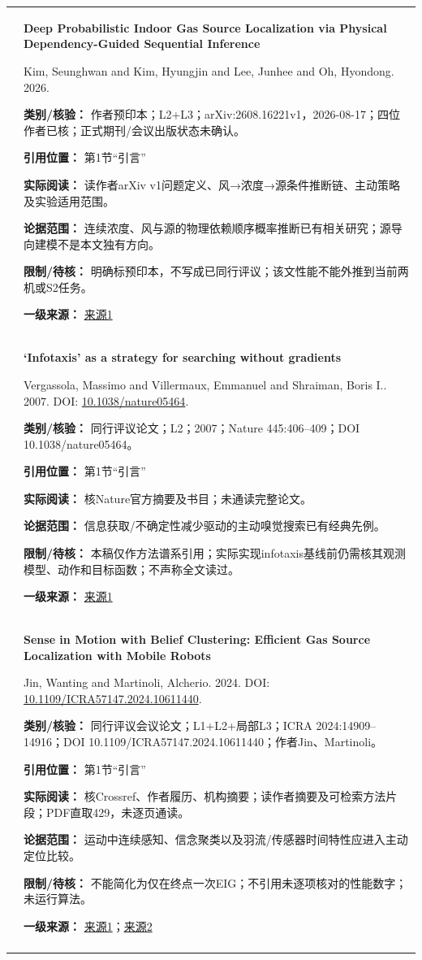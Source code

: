 \begin{longtable}{@{}>{\raggedright\arraybackslash}p{0.7cm}>{\raggedright\arraybackslash}p{14.8cm}@{}}
11 & \textbf{Deep Probabilistic Indoor Gas Source Localization via Physical Dependency-Guided Sequential Inference}\par Kim, Seunghwan and Kim, Hyungjin and Lee, Junhee and Oh, Hyondong. 2026. \par\textbf{类别/核验：} 作者预印本；L2+L3；arXiv:2608.16221v1，2026-08-17；四位作者已核；正式期刊/会议出版状态未确认。\par\textbf{引用位置：} 第1节“引言”\par\textbf{实际阅读：} 读作者arXiv v1问题定义、风→浓度→源条件推断链、主动策略及实验适用范围。\par\textbf{论据范围：} 连续浓度、风与源的物理依赖顺序概率推断已有相关研究；源导向建模不是本文独有方向。\par\textbf{限制/待核：} 明确标预印本，不写成已同行评议；该文性能不能外推到当前两机或S2任务。\par\textbf{一级来源：} \href{https://arxiv.org/html/2608.16221v1}{来源1} \\\addlinespace[6pt]
12 & \textbf{`Infotaxis' as a strategy for searching without gradients}\par Vergassola, Massimo and Villermaux, Emmanuel and Shraiman, Boris I.. 2007. DOI: \url{10.1038/nature05464}. \par\textbf{类别/核验：} 同行评议论文；L2；2007；Nature 445:406–409；DOI 10.1038/nature05464。\par\textbf{引用位置：} 第1节“引言”\par\textbf{实际阅读：} 核Nature官方摘要及书目；未通读完整论文。\par\textbf{论据范围：} 信息获取/不确定性减少驱动的主动嗅觉搜索已有经典先例。\par\textbf{限制/待核：} 本稿仅作方法谱系引用；实际实现infotaxis基线前仍需核其观测模型、动作和目标函数；不声称全文读过。\par\textbf{一级来源：} \href{https://www.nature.com/articles/nature05464}{来源1} \\\addlinespace[6pt]
13 & \textbf{Sense in Motion with Belief Clustering: Efficient Gas Source Localization with Mobile Robots}\par Jin, Wanting and Martinoli, Alcherio. 2024. DOI: \url{10.1109/ICRA57147.2024.10611440}. \par\textbf{类别/核验：} 同行评议会议论文；L1+L2+局部L3；ICRA 2024:14909–14916；DOI 10.1109/ICRA57147.2024.10611440；作者Jin、Martinoli。\par\textbf{引用位置：} 第1节“引言”\par\textbf{实际阅读：} 核Crossref、作者履历、机构摘要；读作者摘要及可检索方法片段；PDF直取429，未逐页通读。\par\textbf{论据范围：} 运动中连续感知、信念聚类以及羽流/传感器时间特性应进入主动定位比较。\par\textbf{限制/待核：} 不能简化为仅在终点一次EIG；不引用未逐项核对的性能数字；未运行算法。\par\textbf{一级来源：} \href{https://infoscience.epfl.ch/entities/publication/22992bbb-65c6-4b2c-a983-17f4050d44f2}{来源1}；\href{https://graphsearch.epfl.ch/en/publication/22992bbb-65c6-4b2c-a983-17f4050d44f2}{来源2} \\\addlinespace[6pt]

\end{longtable}
